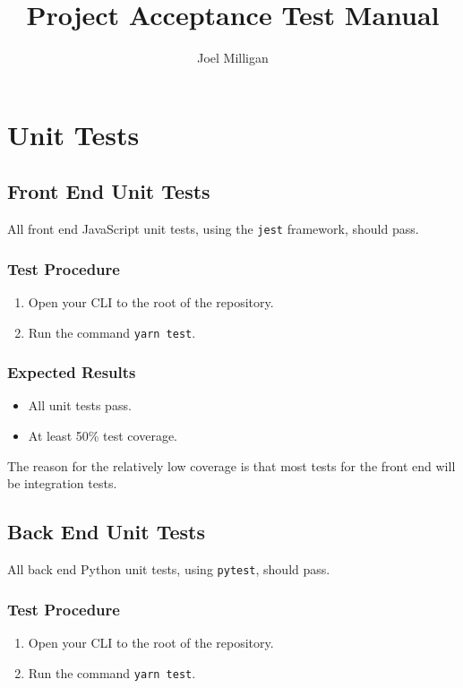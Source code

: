 \documentclass[a4paper, draft]{article}
\author{Joel Milligan}
\title{Project Acceptance Test Manual}
\date{}
\begin{document}
\setcounter{tocdepth}{2}
\setcounter{secnumdepth}{2}

\maketitle
\tableofcontents

\newpage
\section{Unit Tests}
\subsection{Front End Unit Tests}
All front end JavaScript unit tests, using the \texttt{jest} framework, should pass.

\subsubsection{Test Procedure}
\begin{enumerate}
    \item Open your CLI to the root of the repository.
    \item Run the command \texttt{yarn test}.
\end{enumerate}

\subsubsection{Expected Results}
\begin{itemize}
    \item All unit tests pass.
    \item At least 50\% test coverage.
\end{itemize}
The reason for the relatively low coverage is that most tests for the front end will be integration tests.

\subsection{Back End Unit Tests}
All back end Python unit tests, using \texttt{pytest}, should pass.

\subsubsection{Test Procedure}
\begin{enumerate}
    \item Open your CLI to the root of the repository.
    \item Run the command \texttt{yarn test}.
\end{enumerate}
\end{document}
